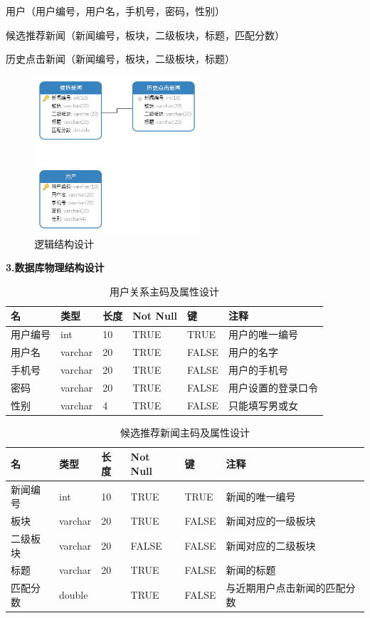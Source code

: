 \documentclass[withoutpreface,bwprint]{cumcmthesis} %
\begin{document}
	用户（用户编号，用户名，手机号，密码，性别）\par
	候选推荐新闻（新闻编号，板块，二级板块，标题，匹配分数）\par
	历史点击新闻（新闻编号，板块，二级板块，标题）\par
	\begin{figure}[H]
		\centering
		\includegraphics[width=0.55\textwidth]{逻辑结构设计}
		\caption{逻辑结构设计}
		\label{fig:circuit-diagcam}
	\end{figure}		
	\textbf{3.数据库物理结构设计}\par
	\begin{table}[!ht]
		\centering
		\caption{用户关系主码及属性设计}
		\begin{tabular}{|l|l|l|l|l|l|}
			\hline
			\textbf{名} & \textbf{类型} & \textbf{长度} & \textbf{Not Null} & \textbf{键} & \textbf{注释 } \\ \hline
			用户编号 & int & 10 & TRUE & TRUE & 用户的唯一编号  \\ \hline
			用户名 & varchar & 20 & TRUE & FALSE & 用户的名字  \\ \hline
			手机号 & varchar & 20 & TRUE & FALSE & 用户的手机号  \\ \hline
			密码 & varchar & 20 & TRUE & FALSE & 用户设置的登录口令  \\ \hline
			性别 & varchar & 4 & TRUE & FALSE & 只能填写男或女  \\ \hline
		\end{tabular}
	\end{table}
	
	\begin{table}[!ht]
		\centering
		\caption{候选推荐新闻主码及属性设计}
		\begin{tabular}{|l|l|l|l|l|l|}
			\hline
			\textbf{名} & \textbf{类型} & \textbf{长度} & \textbf{Not Null} & \textbf{键} & \textbf{注释 } \\ \hline
			新闻编号 & int & 10 & TRUE & TRUE & 新闻的唯一编号  \\ \hline
			板块 & varchar & 20 & TRUE & FALSE & 新闻对应的一级板块  \\ \hline
			二级板块 & varchar & 20 & FALSE & FALSE & 新闻对应的二级板块  \\ \hline
			标题 & varchar & 20 & TRUE & FALSE & 新闻的标题  \\ \hline
			匹配分数 & double & ~ & TRUE & FALSE & 与近期用户点击新闻的匹配分数  \\ \hline
		\end{tabular}
	\end{table}
	
\end{document}
